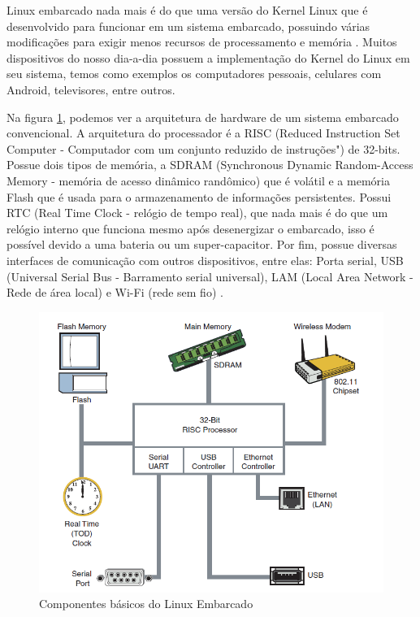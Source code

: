 Linux embarcado  nada mais é do que uma versão do Kernel Linux que é desenvolvido para funcionar em um sistema embarcado, possuindo várias modificações para exigir menos recursos de processamento e memória \cite{Molloy2016}. Muitos dispositivos do nosso dia-a-dia possuem a implementação do Kernel do Linux em seu sistema, temos como exemplos os computadores pessoais, celulares com Android, televisores, entre outros. 

Na figura \ref{fig:componentes_linux_p13}, podemos ver a arquitetura de hardware de um sistema embarcado convencional. A arquitetura do processador é a RISC (Reduced Instruction Set Computer - Computador com um conjunto reduzido de instruções") de 32-bits. Possue dois tipos de memória, a SDRAM (Synchronous Dynamic Random-Access Memory - memória de acesso dinâmico randômico) que é volátil e a memória Flash que é usada para o armazenamento de informações persistentes. Possui RTC (Real Time Clock - relógio de tempo real), que nada mais é do que um relógio interno que funciona mesmo após desenergizar o embarcado, isso é possível devido a uma bateria ou um super-capacitor. Por fim, possue diversas interfaces de comunicação com outros dispositivos, entre elas: Porta serial, USB (Universal Serial Bus - Barramento serial universal), LAM (Local Area Network - Rede de área local) e Wi-Fi (rede sem fio) .

\begin{figure}[!ht]
  \caption{Componentes básicos do Linux Embarcado}
  \begin{center}
      \includegraphics[scale=0.55]{img/componentes_linux_p13}
  \end{center}
  \label{fig:componentes_linux_p13}
\end{figure}

